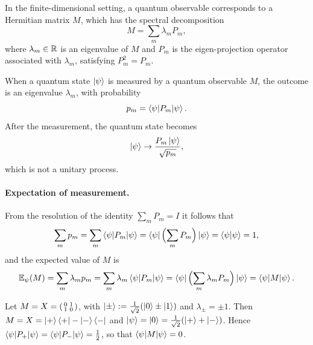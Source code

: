 \begin{definition}
In the finite-dimensional setting, a quantum observable corresponds to a
Hermitian matrix $M$, which has the spectral decomposition
\begin{equation}
  M = \sum_m \lambda_m P_m,
\end{equation}
where $\lambda_m \in \mathbb{R}$ is an eigenvalue of $M$ and $P_m$ is the eigen-projection
operator associated with $\lambda_m$, satisfying $P_m^2 = P_m$.
\end{definition}

When a quantum state $\ket{\psi}$ is measured by a quantum observable $M$, the
outcome is an eigenvalue $\lambda_m$, with probability
\begin{equation}
  p_m = \braket{\psi|P_m|\psi}.
\end{equation}
After the measurement, the quantum state becomes
\begin{equation}
  \ket{\psi} \to \frac{P_m\ket{\psi}}{\sqrt{p_m}},
\end{equation}
which is not a unitary process.

\paragraph{Expectation of measurement.}
From the resolution of the identity $\sum_m P_m = I$ it follows that
\begin{equation}
  \sum_m p_m = \sum_m \braket{\psi|P_m|\psi}
  = \bra{\psi}\Bigl(\sum_m P_m\Bigr)\ket{\psi} = \braket{\psi|\psi} = 1,
\end{equation}
and the expected value of $M$ is
\begin{equation}
  \mathbb{E}_\psi(M) = \sum_m \lambda_m p_m
  = \sum_m \lambda_m \braket{\psi|P_m|\psi}
  = \bra{\psi}\Bigl(\sum_m \lambda_m P_m\Bigr)\ket{\psi}
  = \braket{\psi|M|\psi}.
\end{equation}

\begin{example}
Let $M = X = \begin{psmallmatrix} 0 & 1 \\ 1 & 0 \end{psmallmatrix}$, with
$\ket{\pm} := \tfrac{1}{\sqrt{2}}(\ket{0} \pm \ket{1})$ and $\lambda_\pm = \pm 1$.
Then $M = X = \ket{+}\bra{+} - \ket{-}\bra{-}$ and
$\ket{\psi} = \ket{0} = \tfrac{1}{\sqrt{2}}(\ket{+} + \ket{-})$. Hence
$\braket{\psi|P_+|\psi} = \braket{\psi|P_-|\psi} = \tfrac{1}{2}$, so that
$\braket{\psi|M|\psi} = 0$.
\end{example}

